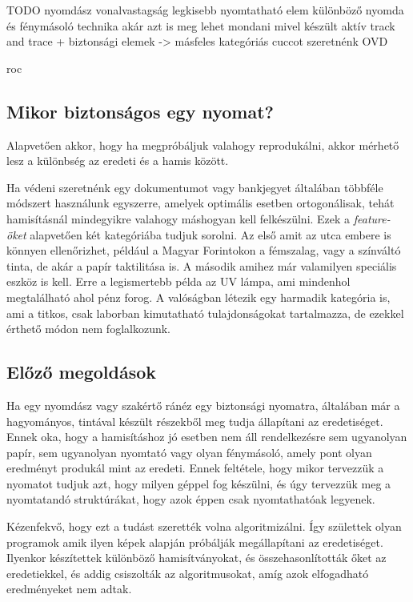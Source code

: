 TODO
nyomdász
vonalvastagság
legkisebb nyomtatható elem
különböző nyomda és fénymásoló technika
akár azt is meg lehet mondani mivel készült
aktív track and trace + biztonsági elemek
-> másfeles kategóriás cuccot szeretnénk
OVD


roc


\subsection{Mikor biztonságos egy nyomat?}

Alapvetően akkor, hogy ha megpróbáljuk valahogy reprodukálni, akkor
mérhető lesz a különbség az eredeti és a hamis között.

Ha védeni szeretnénk egy dokumentumot vagy bankjegyet általában 
többféle módszert használunk egyszerre, amelyek optimális esetben 
ortogonálisak, tehát hamisításnál mindegyikre valahogy máshogyan kell 
felkészülni. Ezek a \textit{feature-öket} alapvetően két kategóriába tudjuk sorolni. 
Az első amit az utca embere is könnyen ellenőrizhet, például a Magyar Forintokon 
a fémszalag, vagy a színváltó tinta, de akár a papír taktilitása is.
A második amihez már valamilyen speciális eszköz is kell. Erre a legismertebb 
példa az UV lámpa, ami mindenhol megtalálható ahol pénz forog.
A valóságban létezik egy harmadik kategória is, ami a titkos, csak 
laborban kimutatható tulajdonságokat tartalmazza, de ezekkel érthető
módon nem foglalkozunk.


\subsection{Előző megoldások}

Ha egy nyomdász vagy szakértő ránéz egy biztonsági nyomatra, 
általában már a hagyományos, tintával készült részekből meg tudja
állapítani az eredetiséget. Ennek oka, hogy a hamisításhoz jó esetben nem áll 
rendelkezésre sem ugyanolyan papír, sem ugyanolyan nyomtató vagy olyan fénymásoló,
amely pont olyan eredményt produkál mint az eredeti.
Ennek feltétele, hogy mikor tervezzük a nyomatot tudjuk azt, hogy
milyen géppel fog készülni, és úgy tervezzük meg a nyomtatandó struktúrákat,
hogy azok éppen csak nyomtathatóak legyenek.


Kézenfekvő, hogy ezt a tudást szerették volna algoritmizálni. Így születtek olyan
programok amik ilyen képek alapján próbálják megállapítani az eredetiséget. 
Ilyenkor készítettek különböző hamisítványokat, és összehasonlították őket az eredetiekkel,
és addig csiszolták az algoritmusokat, amíg azok elfogadható eredményeket nem adtak.


